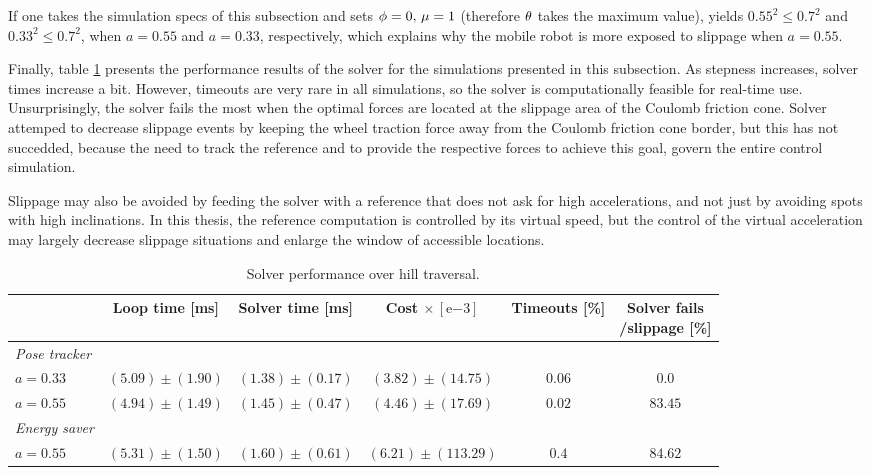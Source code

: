 If one takes the simulation specs of this subsection and sets $\phi = 0,\,\mu = 1$ (therefore $\theta$ takes the maximum value),  yields $0.55^2 \leq 0.7^2$ and $0.33^2 \leq 0.7^2$, when $a=0.55$ and $a=0.33$, respectively, which explains why the mobile robot is more exposed to slippage when $a=0.55$.

Finally, table \ref{tab:hillSolverPerformance} presents the performance results of the solver for the simulations presented in this subsection. As stepness increases, solver times increase a bit. However, timeouts are very rare in all simulations, so the solver is computationally feasible for real-time use. Unsurprisingly, the solver fails the most when the optimal forces are located at the slippage area of the Coulomb friction cone. Solver  attemped to decrease slippage events by keeping the wheel traction force away from the Coulomb friction cone border, but this has not succedded, because the need to track the reference and to provide the respective forces to achieve this goal, govern the entire control simulation.

\begin{remark}
Slippage may also be avoided by feeding the solver with a reference that does not ask for high accelerations, and not just by avoiding spots with high inclinations. In this thesis, the reference computation is controlled by its virtual speed, but the control of the virtual acceleration may largely decrease slippage situations and enlarge the window of accessible locations.
\end{remark}

\begin{table}[!htb]
  \caption[Solver performance on hilly terrain.]{Solver performance over hill traversal.}
  \label{tab:hillSolverPerformance}
  \renewcommand{\arraystretch}{1.2}
  \centering
  \begin{tabular}[]{lccccc}
	\toprule
	& Loop time [ms] & Solver time [ms] & Cost $\times\,[\mathrm{e}{-3}]$ & Timeouts [\%] & \shortstack{Solver fails\\/slippage [\%]} \\
	\midrule
	\textit{Pose tracker} & & & & & \\
	$a=0.33$ & $(5.09) \pm (1.90)$ & $(1.38) \pm (0.17)$ & $(3.82) \pm (14.75)$ & $0.06$ & $0.0$\\
	$a=0.55$ & $(4.94) \pm (1.49)$ & $(1.45) \pm (0.47)$ & $(4.46) \pm (17.69)$ & $0.02$ & $83.45$\\
	\textit{Energy saver} & & & & & \\
	$a=0.55$ & $(5.31) \pm (1.50)$ & $(1.60) \pm (0.61)$ & $(6.21) \pm (113.29)$ & $0.4$ & $84.62$\\
  	\bottomrule
  \end{tabular}
\end{table}

